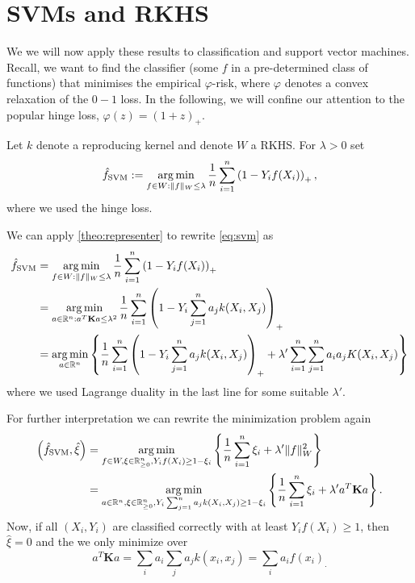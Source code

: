 \section{SVMs and RKHS}

We we will now apply these results to classification and support vector machines. Recall, we want to find the classifier (some $f$ in a pre-determined class of functions) that minimises the empirical $\varphi$-risk, where $\varphi$ denotes a convex relaxation of the $0-1$ loss. In the following, we will confine our attention to the popular hinge loss, $\varphi(z) = (1 + z)_+$.

\begin{definition}
Let $k$ denote a reproducing kernel and denote $W$ a RKHS. For $\lambda > 0$ set
\begin{equation}\label{eq:svm}
	\hat{f}_\mathrm{SVM} := \operatorname*{arg\,min}_{f \in W: \|f\|_W \leq \lambda} \frac{1}{n}\sum_{i = 1}^n \left(1 - Y_i f(X_i)\right)_+,
\end{equation}
where we used the hinge loss.
\end{definition}

We can apply \autoref{theo:representer} to rewrite \eqref{eq:svm} as
\begin{align*}
	\hat{f}_\mathrm{SVM} &= \operatorname*{arg\,min}_{f \in W: \|f\|_W \leq \lambda} \frac{1}{n}\sum_{i = 1}^n \left(1 - Y_i f(X_i)\right)_+ \\
											 &= \operatorname*{arg\,min}_{a \in \mathbb{R}^n: a^T\mathbf{K}a \leq \lambda^2} \frac{1}{n}\sum_{i = 1}^n \left(1 - Y_i \sum_{j=1}^n a_j k(X_i, X_j)\right)_+ \\
											 &= \operatorname*{arg\,min}_{a \in \mathbb{R}^n} \left\{\frac{1}{n}\sum_{i = 1}^n \left(1 - Y_i \sum_{j=1}^n a_j k(X_i, X_j)\right)_+ + \lambda' \sum_{i=1}^n\sum_{j=1}^n a_ia_j K(X_i, X_j) \right\}
\end{align*}
where we used Lagrange duality in the last line for some suitable $\lambda'$.

For further interpretation we can rewrite the minimization problem again
\begin{align*}
	\left(\hat{f}_\mathrm{SVM}, \hat{\xi} \right) &= \operatorname*{arg\,min}_{f \in W, \xi \in \mathbb{R}_{\geq 0}^n, Y_if(X_i) \geq 1 - \xi_i} \left\{\frac{1}{n}\sum_{i=1}^n \xi_i + \lambda'\|f\|_W^2\right\} \\
	&=\operatorname*{arg\,min}_{a\in\mathbb{R}^n, \xi \in \mathbb{R}_{\geq 0}^n, Y_i\sum_{j=1}^n a_j k(X_i, X_j) \geq 1 - \xi_i} \left\{\frac{1}{n}\sum_{i=1}^n \xi_i + \lambda'a^T\mathbf{K}a\right\}.
\end{align*}
Now, if all $(X_i, Y_i)$ are classified correctly with at least $Y_if(X_i) \geq 1$, then $\hat{\xi} = 0$ and the we only minimize over $$a^T\mathbf{K}a = \sum_ia_i \sum_j a_j k(x_i, x_j)=\sum_i a_i f(x_i)_.$$


